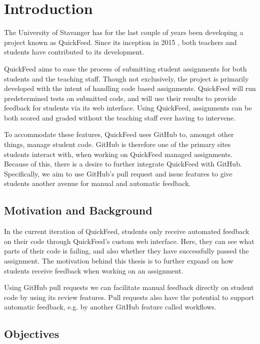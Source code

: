 
\chapter{Introduction}
\label{ch:intro}

The University of Stavanger has for the last couple of years been developing a project known as QuickFeed.
Since its inception in 2015 \cite{autograder}, both teachers and students have contributed to its development.

QuickFeed aims to ease the process of submitting student assignments for both students and the teaching staff.
Though not exclusively, the project is primarily developed with the intent of handling code based assignments.
QuickFeed will run predetermined tests on submitted code, and will use their results to provide feedback for students via its web interface.
Using QuickFeed, assignments can be both scored and graded without the teaching staff ever having to intervene.

To accommodate these features, QuickFeed uses GitHub to, amongst other things, manage student code.
GitHub is therefore one of the primary sites students interact with, when working on QuickFeed managed assignments.
Because of this, there is a desire to further integrate QuickFeed with GitHub.
Specifically, we aim to use GitHub's pull request and issue features to give students another avenue for manual and automatic feedback.

\section{Motivation and Background}
\label{sec:motivation}

In the current iteration of QuickFeed, students only receive automated feedback on their code through QuickFeed's custom web interface.
Here, they can see what parts of their code is failing, and also whether they have successfully passed the assignment.
The motivation behind this thesis is to further expand on how students receive feedback when working on an assignment.

Using GitHub pull requests we can facilitate manual feedback directly on student code by using its review features.
Pull requests also have the potential to support automatic feedback, e.g. by another GitHub feature called workflows.

\section{Objectives}

